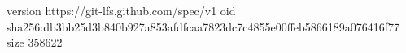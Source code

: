 version https://git-lfs.github.com/spec/v1
oid sha256:db3bb25d3b840b927a853afdfcaa7823dc7c4855e00ffeb5866189a076416f77
size 358622
